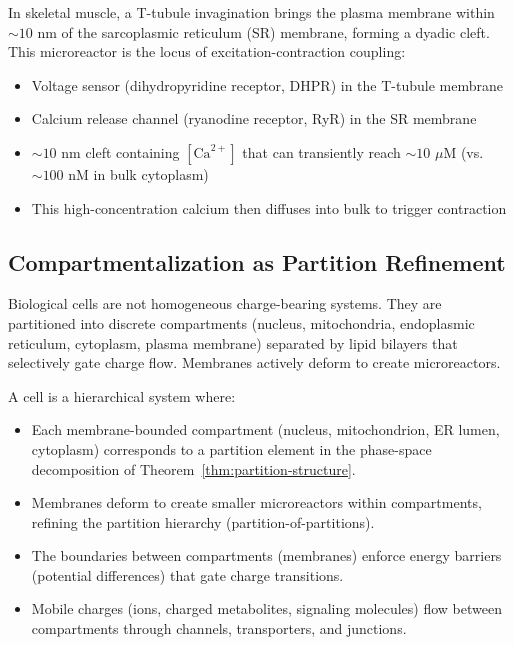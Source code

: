 \begin{example}
\label{ex:muscle-dyad}
In skeletal muscle, a T-tubule invagination brings the plasma membrane within $\sim 10$ nm of the sarcoplasmic reticulum (SR) membrane, forming a dyadic cleft. This microreactor is the locus of excitation-contraction coupling:
\begin{itemize}[noitemsep]
\item Voltage sensor (dihydropyridine receptor, DHPR) in the T-tubule membrane
\item Calcium release channel (ryanodine receptor, RyR) in the SR membrane
\item $\sim 10$ nm cleft containing $[\text{Ca}^{2+}]$ that can transiently reach $\sim 10$ $\mu$M (vs. $\sim 100$ nM in bulk cytoplasm)
\item This high-concentration calcium then diffuses into bulk to trigger contraction
\end{itemize}
\end{example}

\subsection{Compartmentalization as Partition Refinement}
\label{subsec:compartmentalization}

Biological cells are not homogeneous charge-bearing systems. They are partitioned into discrete compartments (nucleus, mitochondria, endoplasmic reticulum, cytoplasm, plasma membrane) separated by lipid bilayers that selectively gate charge flow. Membranes actively deform to create microreactors.

\begin{definition}
\label{def:cellular-partitions}
A cell is a hierarchical system where:
\begin{itemize}[noitemsep]
\item Each membrane-bounded compartment (nucleus, mitochondrion, ER lumen, cytoplasm) corresponds to a partition element in the phase-space decomposition of Theorem~\ref{thm:partition-structure}.
\item Membranes deform to create smaller microreactors within compartments, refining the partition hierarchy (partition-of-partitions).
\item The boundaries between compartments (membranes) enforce energy barriers (potential differences) that gate charge transitions.
\item Mobile charges (ions, charged metabolites, signaling molecules) flow between compartments through channels, transporters, and junctions.
\end{itemize}
\end{definition}

